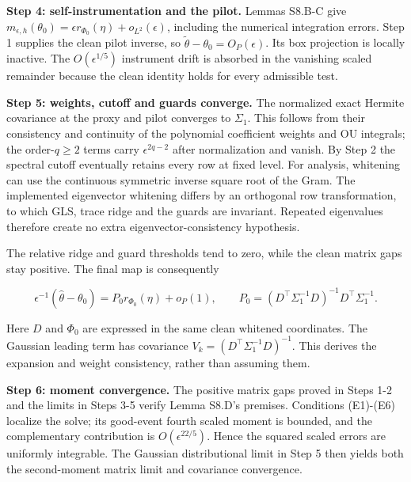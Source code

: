 \documentclass[
  american,
  11pt,
]{article}
\begin{document}
\textbf{Step 4: self-instrumentation and the pilot.} Lemmas S8.B-C give
\(m_{\epsilon,h}(\theta_0)=\epsilon r_{\Phi_0}(\eta)+o_{L^2}(\epsilon)\),
including the numerical integration errors. Step 1 supplies the clean
pilot inverse, so \(\widetilde\theta-\theta_0=O_P(\epsilon)\). Its box
projection is locally inactive. The \(O(\epsilon^{1/5})\) instrument
drift is absorbed in the vanishing scaled remainder because the clean
identity holds for every admissible test.

\textbf{Step 5: weights, cutoff and guards converge.} The normalized
exact Hermite covariance at the proxy and pilot converges to
\(\Sigma_1\). This follows from their consistency and continuity of the
polynomial coefficient weights and OU integrals; the order-\(q\geq2\)
terms carry \(\epsilon^{2q-2}\) after normalization and vanish. By Step
2 the spectral cutoff eventually retains every row at fixed level. For
analysis, whitening can use the continuous symmetric inverse square root
of the Gram. The implemented eigenvector whitening differs by an
orthogonal row transformation, to which GLS, trace ridge and the guards
are invariant. Repeated eigenvalues therefore create no extra
eigenvector-consistency hypothesis.

The relative ridge and guard thresholds tend to zero, while the clean
matrix gaps stay positive. The final map is consequently

\[
\epsilon^{-1}(\widehat\theta-\theta_0)
=P_0 r_{\Phi_0}(\eta)+o_P(1),\qquad
P_0=(D^\top\Sigma_1^{-1}D)^{-1}D^\top\Sigma_1^{-1}.
\]

Here \(D\) and \(\Phi_0\) are expressed in the same clean whitened
coordinates. The Gaussian leading term has covariance
\(V_k=(D^\top\Sigma_1^{-1}D)^{-1}\). This derives the expansion and
weight consistency, rather than assuming them.

\textbf{Step 6: moment convergence.} The positive matrix gaps proved in
Steps 1-2 and the limits in Steps 3-5 verify Lemma S8.D's premises.
Conditions (E1)-(E6) localize the solve; its good-event fourth scaled
moment is bounded, and the complementary contribution is
\(O(\epsilon^{22/5})\). Hence the squared scaled errors are uniformly
integrable. The Gaussian distributional limit in Step 5 then yields both
the second-moment matrix limit and covariance convergence.
\end{document}
